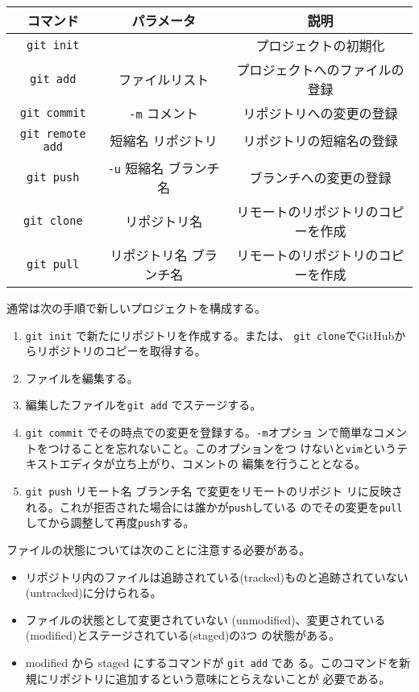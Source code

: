 \begin{tabular}{|c|c|c|}\hline
コマンド&パラメータ&説明\\\hline
\Verb+git init+ & &プロジェクトの初期化\\\hline
\Verb+git add+ & ファイルリスト&プロジェクトへのファイルの登録 \\\hline
\Verb+git commit+& \Verb+-m+ コメント& リポジトリへの変更の登録\\ \hline
\Verb+git remote add+ &短縮名 リポジトリ & リポジトリの短縮名の登録\\
 \hline
\Verb+git push+ &\Verb+-u+ 短縮名 ブランチ名 &ブランチへの変更の登録 \\ \hline
\Verb+git clone+ &リポジトリ名 &リモートのリポジトリのコピーを作成\\ \hline
\Verb+git pull+ &リポジトリ名 ブランチ名 &リモートのリポジトリのコピーを作成\\ \hline
\end{tabular}

通常は次の手順で新しいプロジェクトを構成する。
\begin{enumerate}
 \item \Verb+git init+ で新たにリポジトリを作成する。または、
			 \Verb+git clone+でGitHubからリポジトリのコピーを取得する。
 \item ファイルを編集する。
 \item 編集したファイルを\Verb+git add+ でステージする。
 \item \Verb+git commit+ でその時点での変更を登録する。\Verb+-m+オプショ
			 ンで簡単なコメントをつけることを忘れないこと。このオプションをつ
			 けないと\Verb+vim+というテキストエディタが立ち上がり、コメントの
			 編集を行うこととなる。
 \item \Verb+git push+ リモート名 ブランチ名 で変更をリモートのリポジト
			 リに反映される。これが拒否された場合には誰かが\Verb+push+している
			 のでその変更を\Verb+pull+してから調整して再度\Verb+push+する。
\end{enumerate}
ファイルの状態については次のことに注意する必要がある。
\begin{itemize}
 \item リポジトリ内のファイルは追跡されている(tracked)ものと追跡されていない
(untracked)に分けられる。
 \item ファイルの状態として変更されていない
(unmodified)、変更されている(modified)とステージされている(staged)の3つ
の状態がある。
 \item modified から staged にするコマンドが \Verb+git add+ であ
る。このコマンドを新規にリポジトリに追加するという意味にとらえないことが
必要である。
\end{itemize}
